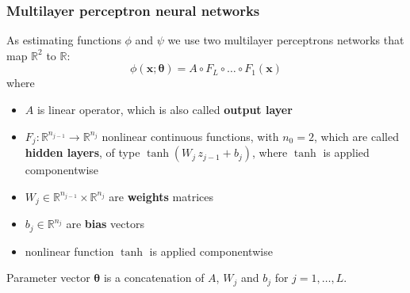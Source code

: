 \documentclass[11pt,aspectratio=169,t]{beamer}
\renewcommand{\vec}[1]{\boldsymbol{#1}}
\newcommand{\VTheta}{\ensuremath{\vec{\theta}}}
\newcommand{\R}{\mathbb R}
\newcommand{\xx}{\vec{x}}
\begin{document}
\begin{frame}
\frametitle{Multilayer perceptron neural networks}

As estimating functions $\phi$ and $\psi$ we use two
multilayer perceptrons networks that map \(\R^{2}\) to \(\R\):
\[
    \phi(\xx; \VTheta) = A \circ F_{L} \circ \dots \circ F_1(\xx)
\]
where
\begin{itemize}
    \item \(A\) is linear operator, which is also called \textbf{output layer}
    \item \(F_j : \R^{n_{j-1}} \to \R^{n_j} \) nonlinear continuous
    functions, with \(n_0 = 2\), which are called \textbf{hidden layers},
    of type $\tanh(W_j \, z_{j-1} + b_j)$, where $\tanh$ is applied
    componentwise
    \item \(W_j \in \R^{n_{j-1}} \times \R^{n_j}\) are \textbf{weights} matrices
    \item \(b_j \in \R^{n_j}\) are \textbf{bias} vectors
    \item nonlinear function \(\tanh\) is applied componentwise
\end{itemize}
Parameter vector $\VTheta$ is a concatenation of $A$, $W_{j}$ and $b_{j}$ for
$j = 1, \dots, L$.
\end{frame}




\end{document}
